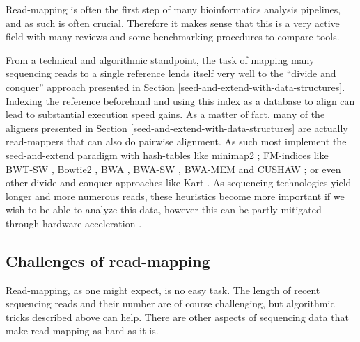 \documentclass[
  11pt,
  twoside,
  BCOR=10mm,
  listof=totoc]{scrbook}
\begin{document}
Read-mapping is often the first step of many bioinformatics analysis pipelines, and as such is often crucial. Therefore it makes sense that this is a very active field with many reviews \autocite{ruffaloComparativeAnalysisAlgorithms2011,schbathMappingReadsGenomic2012,hatemBenchmarkingShortSequence2013,canzarShortReadMapping2017,alserTechnologyDictatesAlgorithms2021} and some benchmarking procedures \autocite{brindaRNFGeneralFramework2016} to compare tools.

From a technical and algorithmic standpoint, the task of mapping many sequencing reads to a single reference lends itself very well to the ``divide and conquer'' approach presented in Section \ref{seed-and-extend-with-data-structures}. Indexing the reference beforehand and using this index as a database to align can lead to substantial execution speed gains. As a matter of fact, many of the aligners presented in Section \ref{seed-and-extend-with-data-structures} are actually read-mappers that can also do pairwise alignment. As such most implement the seed-and-extend paradigm with hash-tables like minimap2 \autocite{liMinimap2PairwiseAlignment2018}; FM-indices like BWT-SW \autocite{lamCompressedIndexingLocal2008}, Bowtie2 \autocite{langmeadFastGappedreadAlignment2012}, BWA \autocite{liFastAccurateShort2009}, BWA-SW \autocite{liFastAccurateLongread2010}, BWA-MEM \autocite{liAligningSequenceReads2013} and CUSHAW \autocite{liuLongReadAlignment2012}; or even other divide and conquer approaches like Kart \autocite{linKartDivideandconquerAlgorithm2017}. As sequencing technologies yield longer and more numerous reads, these heuristics become more important if we wish to be able to analyze this data, however this can be partly mitigated through hardware acceleration \autocite{olsonHardwareAccelerationShort2012,chenAcceleratingNextGeneration2014,suzukiIntroducingDifferenceRecurrence2018,zeniLOGANHighPerformanceGPUBased2020}.

\hypertarget{challenges-of-read-mapping}{%
\subsection{Challenges of read-mapping}\label{challenges-of-read-mapping}}

Read-mapping, as one might expect, is no easy task. The length of recent sequencing reads and their number are of course challenging, but algorithmic tricks described above can help. There are other aspects of sequencing data that make read-mapping as hard as it is.
\end{document}
